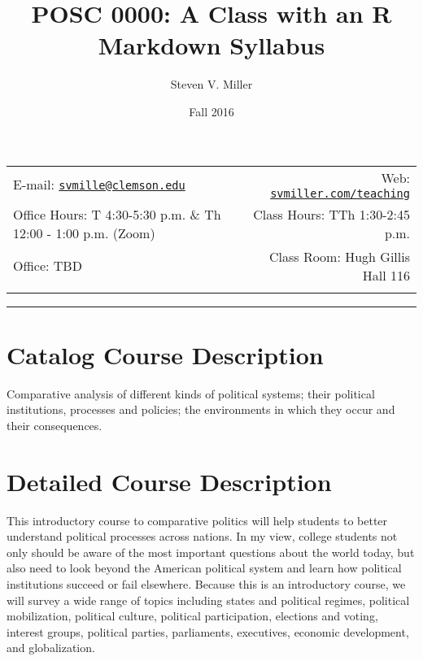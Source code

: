 \documentclass[11pt,]{article}
\title{POSC 0000: A Class with an R Markdown Syllabus}
\author{Steven V. Miller}
\date{Fall 2016}
\begin{document}
  

		\maketitle
		
	
		\thispagestyle{firststyle}



	\noindent \begin{tabular*}{\textwidth}{ @{\extracolsep{\fill}} lr @{\extracolsep{\fill}}}


E-mail: \texttt{\href{mailto:svmille@clemson.edu}{\nolinkurl{svmille@clemson.edu}}} & Web: \href{http://svmiller.com/teaching}{\tt svmiller.com/teaching}\\
Office Hours: T 4:30-5:30 p.m. \& Th 12:00 - 1:00 p.m.
(Zoom)  &  Class Hours: TTh 1:30-2:45 p.m.\\
Office: TBD  & Class Room: Hugh Gillis Hall 116\\
	&  \\
	\hline
	\end{tabular*}
	
\vspace{2mm}
	


\begin{center}\rule{0.5\linewidth}{0.5pt}\end{center}

\hypertarget{catalog-course-description}{%
\section{Catalog Course Description}\label{catalog-course-description}}

Comparative analysis of different kinds of political systems; their
political institutions, processes and policies; the environments in
which they occur and their consequences.

\hypertarget{detailed-course-description}{%
\section{Detailed Course
Description}\label{detailed-course-description}}

This introductory course to comparative politics will help students to
better understand political processes across nations. In my view,
college students not only should be aware of the most important
questions about the world today, but also need to look beyond the
American political system and learn how political institutions succeed
or fail elsewhere. Because this is an introductory course, we will
survey a wide range of topics including states and political regimes,
political mobilization, political culture, political participation,
elections and voting, interest groups, political parties, parliaments,
executives, economic development, and globalization.
\end{document}
